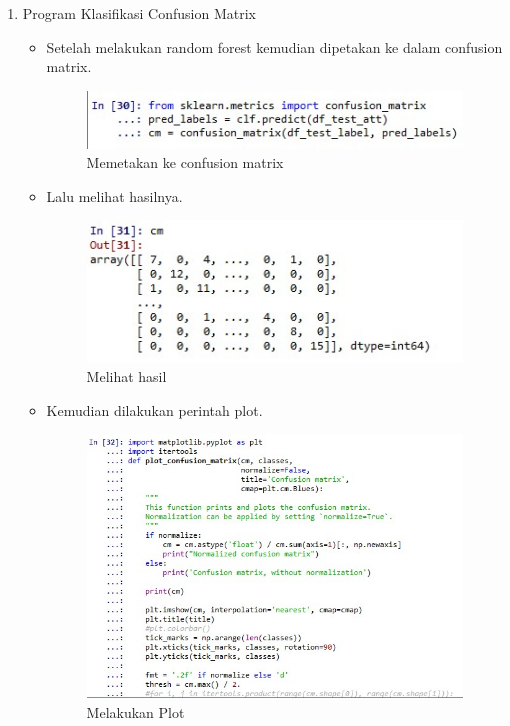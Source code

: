 \begin{enumerate}
\item Program Klasifikasi Confusion Matrix
	\begin{itemize}
		\item Setelah melakukan random forest kemudian dipetakan ke dalam confusion matrix.
			\begin{figure}[ht]
			\centering
			\includegraphics[scale=0.5]{figures/AFS/abc1.jpg}
			\caption{Memetakan ke confusion matrix}
			\label{contoh}
			\end{figure}
		\item Lalu melihat hasilnya.
			\begin{figure}[ht]
			\centering
			\includegraphics[scale=0.5]{figures/AFS/abc2.jpg}
			\caption{Melihat hasil}
			\label{contoh}
			\end{figure}
		\item Kemudian dilakukan perintah plot.
			\begin{figure}[ht]
			\centering
			\includegraphics[scale=0.5]{figures/AFS/abc3.jpg}
			\caption{Melakukan Plot}
			\label{contoh}
			\end{figure}

\end{itemize}
\end{enumerate}
